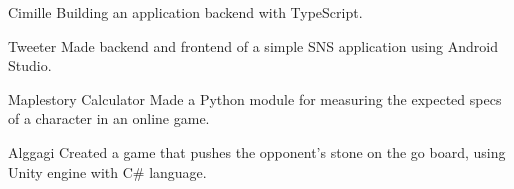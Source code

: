 

\begin{cvskills}

  \cvskill
    {Cimille} %
    {Building an application backend with TypeScript.} %

  \cvskill
    {Tweeter} %
    {Made backend and frontend of a simple SNS application using Android Studio.} %

  \cvskill
    {Maplestory Calculator} %
    {Made a Python module for measuring the expected specs of a character in an online game.} %

  \cvskill
    {Alggagi} %
    {Created a game that pushes the opponent's stone on the go board, using Unity engine with C\# language.} %

\end{cvskills}
